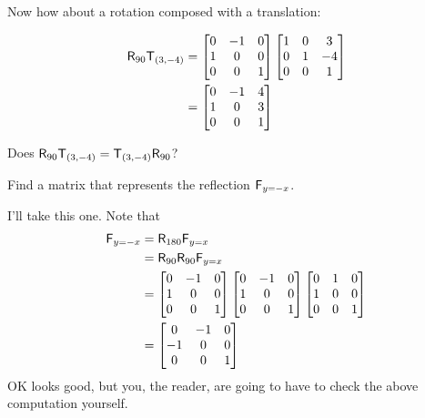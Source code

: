 Now how about a rotation composed with a translation:

\begin{align*}
\mathsf{R}_{90}\mathsf{T}_{(3,-4)} &= \begin{bmatrix}
0 & -1 & 0\\
1 & 0 & 0\\
0 & 0 & 1
\end{bmatrix}
\begin{bmatrix}
1 & 0 & 3\\
0 & 1 & -4\\
0 & 0 & 1
\end{bmatrix}\\
&=
\begin{bmatrix}
0 & -1 & 4\\
1 & 0 & 3\\
0 & 0 & 1
\end{bmatrix}
\end{align*}

\begin{question}
Does $\mathsf{R}_{90}\mathsf{T}_{(3,-4)}= \mathsf{T}_{(3,-4)}\mathsf{R}_{90}$?
\end{question}
\QM

\begin{question} Find a matrix that represents the reflection $\mathsf{F}_{y=-x}$.
\end{question}

I'll take this one. Note that 
\begin{align*}
\mathsf{F}_{y=-x} &= \mathsf{R}_{180} \mathsf{F}_{y=x} \\
&= \mathsf{R}_{90}\mathsf{R}_{90} \mathsf{F}_{y=x}\\
&= \begin{bmatrix}
0 & -1 & 0\\
1 & 0 & 0\\
0 & 0 & 1
\end{bmatrix}
\begin{bmatrix}
0 & -1 & 0\\
1 & 0 & 0\\
0 & 0 & 1
\end{bmatrix}
\begin{bmatrix}
0&  1 & 0\\
1 & 0 & 0\\
0 &  0 & 1
\end{bmatrix} \\
&=\begin{bmatrix}
0 &  -1 & 0\\
-1 & 0 & 0\\
0 &  0 & 1
\end{bmatrix} 
\end{align*}
OK looks good, but you, the reader, are going to have to check the
above computation yourself.



